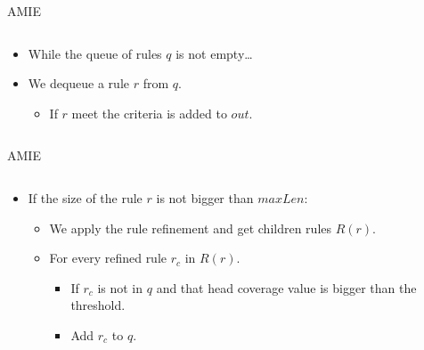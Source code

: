 \documentclass[xcolor={x11names}]{beamer}
\begin{document}
\begin{frame}{AMIE}
\begin{columns}

\begin{column}{0.5\textwidth}
	\begin{itemize}
        \item While the queue of rules $q$ is not empty\ldots
        \item We dequeue a rule $r$ from $q$.
	    \begin{itemize}
            \item If $r$ meet the criteria is added to $out$.
	    \end{itemize}
	\end{itemize}
\end{column}

\begin{column}{0.5\textwidth}
    \resizebox{0.8\textwidth}{!}{%
        
    }
\end{column}
\end{columns}
\end{frame}

\begin{frame}{AMIE}
\begin{columns}
\begin{column}{0.5\textwidth}
	\begin{itemize}
        \item If the size of the rule $r$ is not bigger than $maxLen$:
	    \begin{itemize}
            \item We apply the rule refinement and get children rules $R(r)$.
            \item For every refined rule $r_c$ in $R(r)$.
	        \begin{itemize}
                \item If $r_c$ is not in $q$ and that head coverage value is bigger than the threshold.
                    \item Add $r_c$ to $q$.
	        \end{itemize}
	    \end{itemize}
	\end{itemize}
\end{column}

\begin{column}{0.5\textwidth}
    \resizebox{0.8\textwidth}{!}{%
        
    }
\end{column}
\end{columns}
\end{frame}
\end{document}

